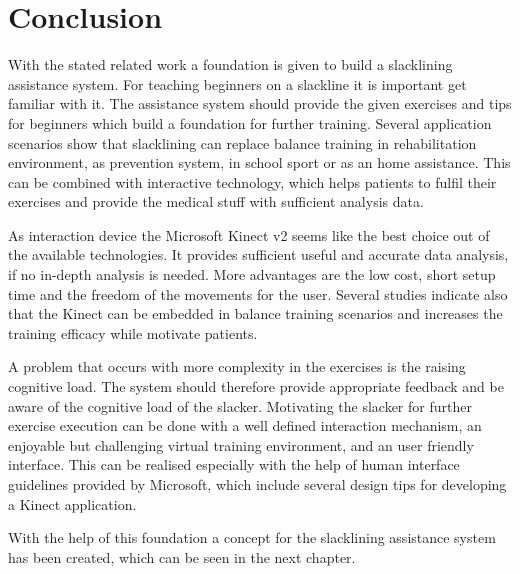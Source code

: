 \section{Conclusion}
With the stated related work a foundation is given to build a slacklining assistance system. For teaching beginners on a slackline it is important get familiar with it. The assistance system should provide the given exercises and tips for beginners which build a foundation for further training.
Several application scenarios show that slacklining can replace balance training in rehabilitation environment, as prevention system, in school sport or as an home assistance. This can be combined with interactive technology, which helps patients to fulfil their exercises and provide the medical stuff with sufficient analysis data.

As interaction device the Microsoft Kinect v2 seems like the best choice out of the available technologies. It provides sufficient useful and accurate data analysis, if no in-depth analysis is needed. More advantages are the low cost, short setup time and the freedom of the movements for the user. Several studies indicate also that the Kinect can be embedded in balance training scenarios and increases the training efficacy while motivate patients.

A problem that occurs with more complexity in the exercises is the raising cognitive load. The system should therefore provide appropriate feedback and be aware of the cognitive load of the slacker. Motivating the slacker for further exercise execution can be done with a well defined interaction mechanism, an enjoyable but challenging virtual training environment, and an user friendly interface. This can be realised especially with the help of human interface guidelines provided by Microsoft, which include several design tips for developing a Kinect application.

With the help of this foundation a concept for the slacklining assistance system has been created, which can be seen in the next chapter.